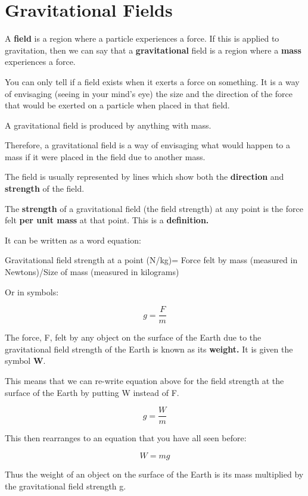 \documentclass[main.tex]{subfiles}
\begin{document}
\chapter{Gravitational Fields}

A \textbf{field} is a region where a particle experiences a force. If this is applied to gravitation, then we can say that a
\textbf{gravitational} field is a region where a \textbf{mass}
experiences a force.

You can only tell if a field exists when it exerts a force on something.
It is a way of envisaging (seeing in your mind's eye) the size and the
direction of the force that would be exerted on a particle when placed
in that field.

A gravitational field is produced by anything with mass.

Therefore, a gravitational field is a way of envisaging what would
happen to a mass if it were placed in the field due to another mass.

The field is usually represented by lines which show both the
\textbf{direction} and \textbf{strength} of the field.

The \textbf{strength} of a gravitational field (the field strength) at
any point is the force felt \textbf{per unit mass} at that point. This
is a \textbf{definition.}

It can be written as a word equation:

Gravitational field strength at a point (N/kg)= Force felt by mass (measured
in Newtons)/Size of mass (measured in kilograms)

Or in symbols:

\[g = \frac{F}{m} \]

The force, F, felt by any object on the surface of the Earth due to the
gravitational field strength of the Earth is known as its
\textbf{weight.} It is given the symbol \textbf{W}.

This means that we can re-write equation above for the field strength at
the surface of the Earth by putting W instead of F.

\[g = \frac{W}{m}\]

This then rearranges to an equation that you have all seen before:

\[W = mg\]

Thus the weight of an object on the surface of the Earth is its mass
multiplied by the gravitational field strength g.
\end{document}
